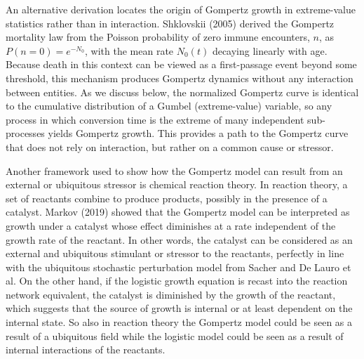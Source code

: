 \documentclass{article}
\begin{document}
An alternative derivation locates the origin of Gompertz growth in extreme-value statistics rather than in interaction. Shklovskii (2005) \cite{shklovskii2005simple} derived the Gompertz mortality law from the Poisson probability of zero immune encounters, $n$, as $P(n=0)=e^{-N_0}$, with the mean rate $N_0(t)$ decaying linearly with age. Because death in this context can be viewed as a first-passage event beyond some threshold, this mechanism produces Gompertz dynamics without any interaction between entities. As we discuss below, the normalized Gompertz curve is identical to the cumulative distribution of a Gumbel (extreme-value) variable, so any process in which conversion time is the extreme of many independent sub-processes yields Gompertz growth. This provides a path to the Gompertz curve that does not rely on interaction, but rather on a common cause or stressor.

Another framework used to show how the Gompertz model can result from an external or ubiquitous stressor is chemical reaction theory. In reaction theory, a set of reactants combine to produce products, possibly in the presence of a catalyst. Markov (2019) \cite{markov2019reaction} showed that the Gompertz model can be interpreted as growth under a catalyst whose effect diminishes at a rate independent of the growth rate of the reactant. In other words, the catalyst can be considered as an external and ubiquitous stimulant or stressor to the reactants, perfectly in line with the ubiquitous stochastic perturbation model from Sacher and De Lauro et al. On the other hand, if the logistic growth equation is recast into the reaction network equivalent, the catalyst is diminished by the growth of the reactant, which suggests that the source of growth is internal or at least dependent on the internal state. So also in reaction theory the Gompertz model could be seen as a result of a ubiquitous field while the logistic model could be seen as a result of internal interactions of the reactants. 
\end{document}

